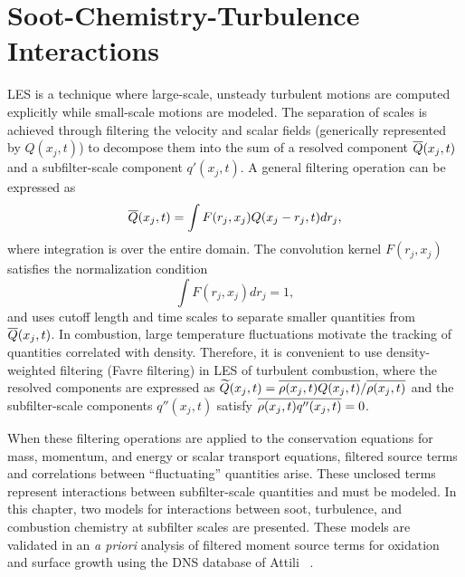 \chapter{Soot-Chemistry-Turbulence Interactions\label{ch:subfilter}}

LES is a technique where large-scale, unsteady turbulent motions are computed explicitly while small-scale motions are modeled. The separation of scales is achieved through filtering the velocity and scalar fields (generically represented by $Q(x_j,t)$) to decompose them into the sum of a resolved component $\overline{Q}(x_j,t)$ and a subfilter-scale component $q'(x_j,t)$. A general filtering operation can be expressed as
\begin{equation}\label{eq:subfilter:filter}
  \overline{Q}(x_j,t) = \int F(r_j,x_j)Q(x_j - r_j, t)dr_j,
\end{equation}
where integration is over the entire domain. The convolution kernel $F(r_j,x_j)$ satisfies the normalization condition
\begin{equation}\label{eq:subfilter:kernel}
  \int F(r_j,x_j)dr_j = 1,
\end{equation}
and uses cutoff length and time scales to separate smaller quantities from $\overline{Q}(x_j,t)$. In combustion, large temperature fluctuations motivate the tracking of quantities correlated with density. Therefore, it is convenient to use density-weighted filtering (Favre filtering) in LES of turbulent combustion, where the resolved components are expressed as $\widetilde{Q}(x_j,t) = \overline{\rho(x_j,t)Q(x_j,t)}/\overline{\rho(x_j,t)}$ and the subfilter-scale components $q''(x_j,t)$ satisfy $\overline{\rho(x_j,t) q''(x_j,t)} = 0$.

When these filtering operations are applied to the conservation equations for mass, momentum, and energy or scalar transport equations, filtered source terms and correlations between ``fluctuating'' quantities arise. These unclosed terms represent interactions between subfilter-scale quantities and must be modeled. In this chapter, two models for interactions between soot, turbulence, and combustion chemistry at subfilter scales are presented. These models are validated in an \textit{a priori} analysis of filtered moment source terms for oxidation and surface growth using the DNS database of Attili \etal~\cite{attili2014}.






